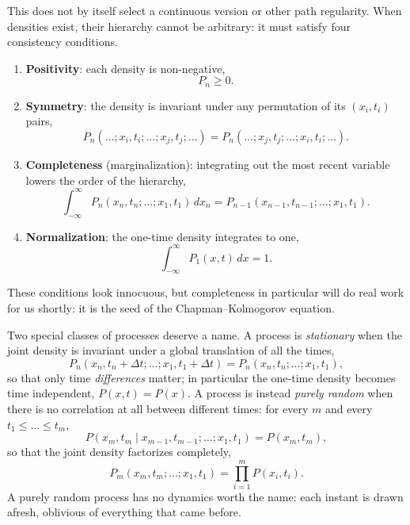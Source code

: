 This does not by itself select a continuous version or other path regularity.
When densities exist, their hierarchy cannot be arbitrary: it must satisfy four consistency conditions.
\begin{enumerate}
    \item \textbf{Positivity}: each density is non-negative,
    \begin{equation}
    P_n \ge 0.
    \end{equation}
    \item \textbf{Symmetry}: the density is invariant under any permutation of its $(x_i,t_i)$ pairs,
    \begin{equation}
    P_n(\dots;x_i,t_i;\dots;x_j,t_j;\dots) = P_n(\dots;x_j,t_j;\dots;x_i,t_i;\dots).
    \end{equation}
    \item \textbf{Completeness} (marginalization): integrating out the most recent variable lowers the order of the hierarchy,
    \begin{equation}
    \int_{-\infty}^{\infty} P_n(x_n,t_n;\dots;x_1,t_1)\,dx_n = P_{n-1}(x_{n-1},t_{n-1};\dots;x_1,t_1).
    \end{equation}
    \item \textbf{Normalization}: the one-time density integrates to one,
    \begin{equation}
    \int_{-\infty}^{\infty} P_1(x,t)\,dx = 1.
    \end{equation}
\end{enumerate}
These conditions look innocuous, but completeness in particular will do real work for us shortly: it is the seed of the Chapman--Kolmogorov equation.

Two special classes of processes deserve a name.
A process is \emph{stationary} when the joint density is invariant under a global translation of all the times,
\begin{equation}
P_n(x_n,t_n+\Delta t;\dots;x_1,t_1+\Delta t) = P_n(x_n,t_n;\dots;x_1,t_1),
\end{equation}
so that only time \emph{differences} matter; in particular the one-time density becomes time independent, $P(x,t)=P(x)$.
A process is instead \emph{purely random} when there is no correlation at all between different times: for every $m$ and every $t_1\le\dots\le t_m$,
\begin{equation}
P(x_m,t_m\mid x_{m-1},t_{m-1};\dots;x_1,t_1) = P(x_m,t_m),
\end{equation}
so that the joint density factorizes completely,
\begin{equation}
P_m(x_m,t_m;\dots;x_1,t_1) = \prod_{i=1}^{m} P(x_i,t_i).
\end{equation}
A purely random process has no dynamics worth the name: each instant is drawn afresh, oblivious of everything that came before.

